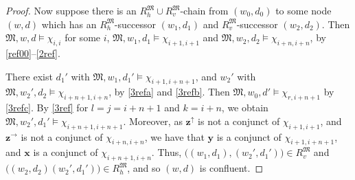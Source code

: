 \documentclass{lmcs} %
\theoremstyle{plain}\newtheorem{satz}[thm]{Satz} %
\newcommand{\bbvarup}{\Zvar^\uparrow}
\newcommand{\bbvarright}{\Zvar^\to}
\newcommand{\fform}[1]{\boldsymbol{#1}}
\newcommand{\xvar}{\fform{x}}
\newcommand{\yvar}{\fform{y}}
\newcommand{\ovar}{\fform{o}}
\newcommand{\Zvar}{\fform{z}}
\newcommand{\Bv}{\forall}
\newcommand{\Bh}{\Box}
\newcommand{\Dv}{\exists}
\begin{document}
\begin{proof}
		Now suppose there is an $R_{h}^\mathfrak M\cup R_{v}^\mathfrak M$-chain from $(w_0,d_0)$
		to some node $(w,d)$ which has an $R_{h}^\mathfrak M$-successor $(w_{1},d_{1})$ and $R_{v}^\mathfrak M$-successor $(w_{2},d_{2})$. Then $\mathfrak M,w,d\models \chi_{i,i}$ for some $i$, 
		$\mathfrak M,w_{1},d_{1}\models \chi_{i+1,i+1}$ and $\mathfrak M,w_{2},d_{2}\models \chi_{i+n,i+n}$, by \eqref{ref00}--\eqref{2ref}.
		
		
		There exist $d_{1}'$ with $\mathfrak M,w_{1},d_{1}'\models \chi_{i+1,i+n+1}$, and $w_{2}'$ with $\mathfrak M,w_{2}',d_{2}\models \chi_{i+n+1,i+n}$, by \eqref{3refa} and \eqref{3refb}.
		Then $\mathfrak M,w_0,d'\models\chi_{r,i+n+1}$ by \eqref{3refc}.
		By \eqref{3ref} for $l=j=i+n+1$ and $k=i+n$,
		we obtain $\mathfrak M,w_{2}',d_{1}'\models \chi_{i+n+1,i+n+1}$.	
		Moreover, as $\bbvarup$ is not a conjunct of $\chi_{i+1,i+1}$, and $\bbvarright$ is not a conjunct of $\chi_{i+n,i+n}$, we have that $\yvar$ is a conjunct of $\chi_{i+1,i+n+1}$, and 
		$\xvar$ is a conjunct of $\chi_{i+n+1,i+n}$. Thus, 
		$\bigl((w_{1},d_{1}),(w_{2}',d_{1}')\bigr)\in R_{v}^\mathfrak M$ and $\bigl((w_{2},d_{2})(w_{2}',d_{1}')\bigr)\in R_{h}^\mathfrak M$,
		and so $(w,d)$ is confluent.
		

\end{proof}
\end{document}
